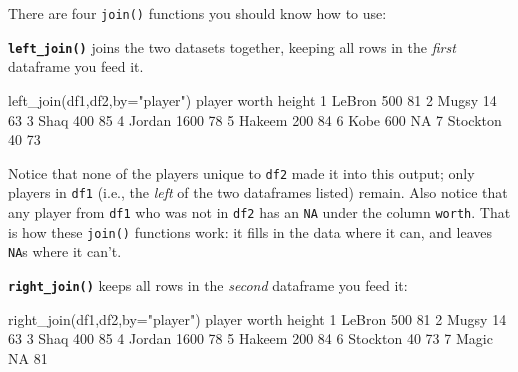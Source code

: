 \documentclass[
]{book}
\newenvironment{Shaded}{\begin{snugshade}}{\end{snugshade}}
\newcommand{\AttributeTok}[1]{\textcolor[rgb]{0.77,0.63,0.00}{#1}}
\newcommand{\ConstantTok}[1]{\textcolor[rgb]{0.00,0.00,0.00}{#1}}
\newcommand{\DecValTok}[1]{\textcolor[rgb]{0.00,0.00,0.81}{#1}}
\newcommand{\FunctionTok}[1]{\textcolor[rgb]{0.00,0.00,0.00}{#1}}
\newcommand{\NormalTok}[1]{#1}
\newcommand{\StringTok}[1]{\textcolor[rgb]{0.31,0.60,0.02}{#1}}
\begin{document}
There are four \texttt{join()} functions you should know how to use:

\textbf{\texttt{left\_join()}} joins the two datasets together, keeping all rows in the \emph{first} dataframe you feed it.

\begin{Shaded}
\begin{Highlighting}[]
\FunctionTok{left\_join}\NormalTok{(df1,df2,}\AttributeTok{by=}\StringTok{"player"}\NormalTok{)}
\NormalTok{    player worth height}
\DecValTok{1}\NormalTok{   LeBron   }\DecValTok{500}     \DecValTok{81}
\DecValTok{2}\NormalTok{    Mugsy    }\DecValTok{14}     \DecValTok{63}
\DecValTok{3}\NormalTok{     Shaq   }\DecValTok{400}     \DecValTok{85}
\DecValTok{4}\NormalTok{   Jordan  }\DecValTok{1600}     \DecValTok{78}
\DecValTok{5}\NormalTok{   Hakeem   }\DecValTok{200}     \DecValTok{84}
\DecValTok{6}\NormalTok{     Kobe   }\DecValTok{600}     \ConstantTok{NA}
\DecValTok{7}\NormalTok{ Stockton    }\DecValTok{40}     \DecValTok{73}
\end{Highlighting}
\end{Shaded}

Notice that none of the players unique to \texttt{df2} made it into this output; only players in \texttt{df1} (i.e., the \emph{left} of the two dataframes listed) remain. Also notice that any player from \texttt{df1} who was not in \texttt{df2} has an \texttt{NA} under the column \texttt{worth}. That is how these \texttt{join()} functions work: it fills in the data where it can, and leaves \texttt{NA}s where it can't.

\textbf{\texttt{right\_join()}} keeps all rows in the \emph{second} dataframe you feed it:

\begin{Shaded}
\begin{Highlighting}[]
\FunctionTok{right\_join}\NormalTok{(df1,df2,}\AttributeTok{by=}\StringTok{"player"}\NormalTok{)}
\NormalTok{    player worth height}
\DecValTok{1}\NormalTok{   LeBron   }\DecValTok{500}     \DecValTok{81}
\DecValTok{2}\NormalTok{    Mugsy    }\DecValTok{14}     \DecValTok{63}
\DecValTok{3}\NormalTok{     Shaq   }\DecValTok{400}     \DecValTok{85}
\DecValTok{4}\NormalTok{   Jordan  }\DecValTok{1600}     \DecValTok{78}
\DecValTok{5}\NormalTok{   Hakeem   }\DecValTok{200}     \DecValTok{84}
\DecValTok{6}\NormalTok{ Stockton    }\DecValTok{40}     \DecValTok{73}
\DecValTok{7}\NormalTok{    Magic    }\ConstantTok{NA}     \DecValTok{81}
\end{Highlighting}
\end{Shaded}
\end{document}
